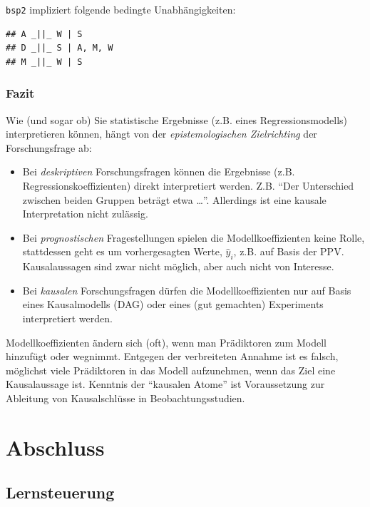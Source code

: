 \documentclass[
  a4paper,
  DIV=11]{scrreprt}
\providecommand{\tightlist}{%
  \setlength{\itemsep}{0pt}\setlength{\parskip}{0pt}}\usepackage{longtable,booktabs,array}
\theoremstyle{definition}
\theoremstyle{remark}
\begin{document}
\texttt{bsp2} impliziert folgende bedingte Unabhängigkeiten:

\begin{verbatim}
## A _||_ W | S
## D _||_ S | A, M, W
## M _||_ W | S
\end{verbatim}

\hypertarget{fazit-4}{%
\subsection{Fazit}\label{fazit-4}}

Wie (und sogar ob) Sie statistische Ergebnisse (z.B. eines
Regressionsmodells) interpretieren können, hängt von der
\emph{epistemologischen Zielrichting} der Forschungsfrage ab:

\begin{itemize}
\tightlist
\item
  Bei \emph{deskriptiven} Forschungsfragen können die Ergebnisse (z.B.
  Regressionskoeffizienten) direkt interpretiert werden. Z.B. ``Der
  Unterschied zwischen beiden Gruppen beträgt etwa \ldots{}''.
  Allerdings ist eine kausale Interpretation nicht zulässig.
\item
  Bei \emph{prognostischen} Fragestellungen spielen die
  Modellkoeffizienten keine Rolle, stattdessen geht es um vorhergesagten
  Werte, \(\hat{y}_i\), z.B. auf Basis der PPV. Kausalaussagen sind zwar
  nicht möglich, aber auch nicht von Interesse.
\item
  Bei \emph{kausalen} Forschungsfragen dürfen die Modellkoeffizienten
  nur auf Basis eines Kausalmodells (DAG) oder eines (gut gemachten)
  Experiments interpretiert werden.
\end{itemize}

Modellkoeffizienten ändern sich (oft), wenn man Prädiktoren zum Modell
hinzufügt oder wegnimmt. Entgegen der verbreiteten Annahme ist es
falsch, möglichst viele Prädiktoren in das Modell aufzunehmen, wenn das
Ziel eine Kausalaussage ist. Kenntnis der ``kausalen Atome'' ist
Voraussetzung zur Ableitung von Kausalschlüsse in Beobachtungsstudien.


\hypertarget{abschluss-1}{%
\chapter{Abschluss}\label{abschluss-1}}

\hypertarget{lernsteuerung-10}{%
\section{Lernsteuerung}\label{lernsteuerung-10}}
\end{document}
